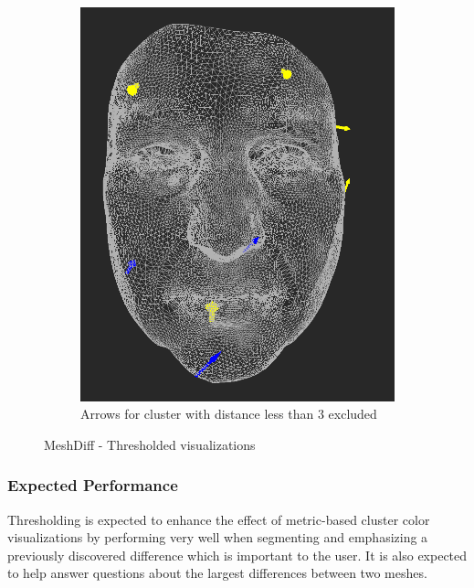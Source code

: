 \begin{figure}[h]
\begin{subfigure}{0.3\textwidth}
	\end{subfigure}
    \qquad
    \begin{subfigure}{0.3\textwidth}
	\includegraphics[width=\textwidth]{./img/meshdiff-thresholding-arrows-length3.PNG}
    \caption{Arrows for cluster with distance less than 3 excluded}
    \label{fig:meshdiff_thresholding_arrows}
	\end{subfigure}
    
\caption{MeshDiff - Thresholded visualizations}
\end{figure}

\subsubsection{Expected Performance}

Thresholding is expected to enhance the effect of metric-based cluster color visualizations by performing very well when segmenting and emphasizing a previously discovered difference which is important to the user. It is also expected to help answer questions about the largest differences between two meshes.
